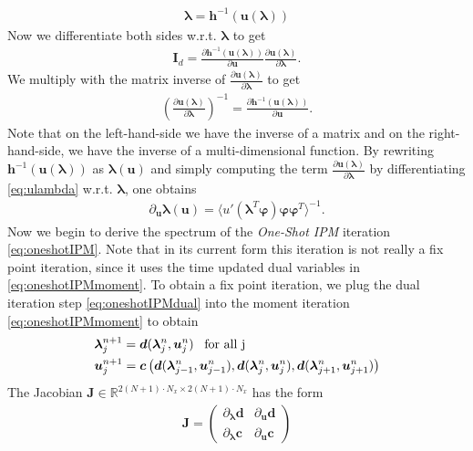 \documentclass[10pt, a4paper, titlepage, bibliography=totocnumbered]{article}
\newenvironment{proof}[1][Proof]{\begin{trivlist}
\item[\hskip \labelsep {\bfseries #1}]}{\end{trivlist}}
\begin{document}
\begin{proof}
\begin{align}
\bm{\lambda} = \bm{h}^{-1}(\bm{u}(\bm{\lambda}))
\end{align}
Now we differentiate both sides w.r.t. $\bm{\lambda}$ to get
\begin{align*}
\bm{I}_{d} = \frac{\partial \bm{h}^{-1}(\bm{u}(\bm{\lambda}))}{\partial \bm{u}}\frac{\partial \bm{u}(\bm{\lambda})}{\partial \bm{\lambda}}.
\end{align*}
We multiply with the matrix inverse of $\frac{\partial \bm{u}(\bm{\lambda})}{\partial \bm{\lambda}}$ to get
\begin{align*}
\left(\frac{\partial \bm{u}(\bm{\lambda})}{\partial \bm{\lambda}}\right)^{-1} = \frac{\partial \bm{h}^{-1}(\bm{u}(\bm{\lambda}))}{\partial \bm{u}}.
\end{align*}
Note that on the left-hand-side we have the inverse of a matrix and on the right-hand-side, we have the inverse of a multi-dimensional function. By rewriting $\bm{h}^{-1}(\bm{u}(\bm{\lambda}))$ as $\bm{\lambda}(\bm{u})$ and simply computing the term $\frac{\partial \bm{u}(\bm{\lambda})}{\partial \bm{\lambda}}$ by differentiating \eqref{eq:ulambda} w.r.t. $\bm{\lambda}$, one obtains
\begin{align}\label{eq:dudlambdaex}
\partial_{\bm{u}} \bm{\lambda}(\bm{u}) = \langle u'(\bm{\lambda}^T\bm{\varphi})\bm{\varphi}\bm{\varphi}^T\rangle^{-1}.
\end{align}
Now we begin to derive the spectrum of the \textit{One-Shot IPM} iteration \eqref{eq:oneshotIPM}. Note that in its current form this iteration is not really a fix point iteration, since it uses the time updated dual variables in \eqref{eq:oneshotIPMmoment}. To obtain a fix point iteration, we plug the dual iteration step \eqref{eq:oneshotIPMdual} into the moment iteration \eqref{eq:oneshotIPMmoment} to obtain
\begin{align*}
&\bm{\lambda}_j^{n+1} = \bm{d}(\bm{\lambda}_j^{n},\bm{u}_j^{n}) \enskip \text{ for all j} \\
&\bm{u}_j^{n+1} =  \bm{c}\left(\bm{d}(\bm{\lambda}_{j-1}^{n},\bm{u}_{j-1}^{n}),\bm{d}(\bm{\lambda}_{j}^{n},\bm{u}_{j}^{n}),\bm{d}(\bm{\lambda}_{j+1}^{n},\bm{u}_{j+1}^{n})\right)
\end{align*}
The Jacobian $\bm{J}\in\mathbb{R}^{2(N+1)\cdot N_x \times 2(N+1)\cdot N_x}$ has the form
\begin{align*}
\bm{J} = 
\begin{pmatrix}
 \partial_{\bm{\lambda}} \bm{d} & \partial_{\bm{u}} \bm{d}  \\
\partial_{\bm{\lambda}} \bm{c} & \partial_{\bm{u}} \bm{c}

\end{pmatrix}
\end{align*}
\end{proof}
\end{document}
